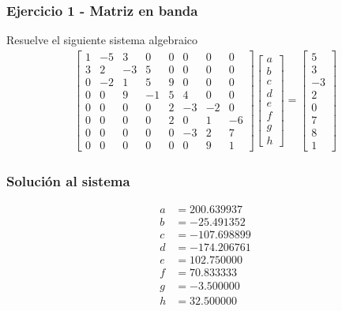 \begin{frame}[plain]
\frametitle{Ejercicio 1 - Matriz en banda}
Resuelve el siguiente sistema algebraico
\begin{align*}
\begin{bmatrix}
1 & -5 & 3 & 0 & 0 & 0 & 0 & 0 \\
3 & 2 & -3 & 5 & 0 & 0 & 0 & 0 \\
0 & -2 & 1 & 5 & 9 & 0 & 0 & 0 \\
0 & 0 & 9 & -1 & 5 & 4 & 0 & 0 \\
0 & 0 & 0 & 0 & 2 & -3 & -2 & 0 \\
0 & 0 & 0 & 0 & 2 & 0 & 1 & -6 \\
0 & 0 & 0 & 0 & 0 & -3 & 2 & 7 \\
0 & 0 & 0 & 0 & 0 & 0 & 9 & 1 
\end{bmatrix}
\begin{bmatrix}
a \\
b \\
c \\
d \\
e \\
f \\
g \\
h
\end{bmatrix}
=
\begin{bmatrix}
5 \\
3 \\
-3 \\
2 \\
0 \\
7 \\
8 \\
1
\end{bmatrix}
\end{align*}
\end{frame}
\begin{frame}
\frametitle{Solución al sistema}
\begin{align*}
a &= 200.639937 \\
b &= -25.491352 \\
c &= -107.698899 \\
d &= -174.206761 \\
e &= 102.750000 \\
f &= 70.833333 \\
g &= -3.500000 \\
h &= 32.500000
\end{align*}
\end{frame}
